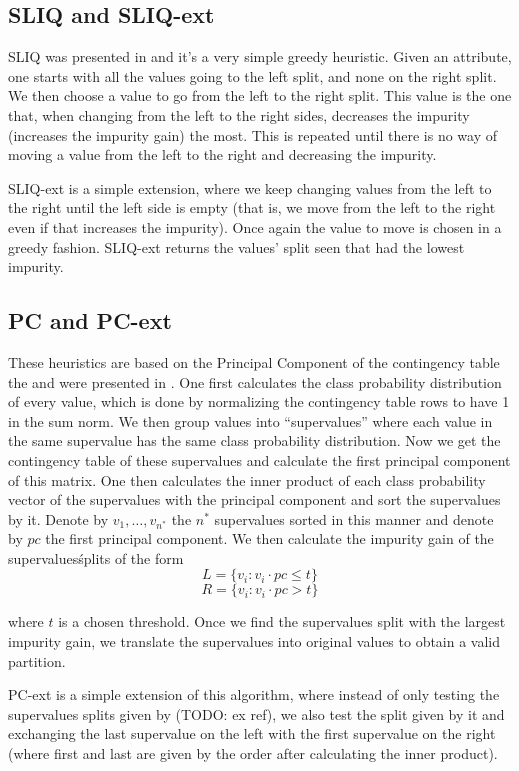 \subsection{SLIQ and SLIQ-ext}
SLIQ was presented in \cite{mehta1996sliq} and it's a very simple greedy heuristic. Given an attribute, one starts with all the values going to the left split, and none on the right split. We then choose a value to go from the left to the right split. This value is the one that, when changing from the left to the right sides, decreases the impurity (increases the impurity gain) the most. This is repeated until there is no way of moving a value from the left to the right and decreasing the impurity.

SLIQ-ext is a simple extension, where we keep changing values from the left to the right until the left side is empty (that is, we move from the left to the right even if that increases the impurity). Once again the value to move is chosen in a greedy fashion. SLIQ-ext returns the values' split seen that had the lowest impurity.

\subsection{PC and PC-ext}
These heuristics are based on the Principal Component of the contingency table the and were presented in \cite{journals/datamine/CoppersmithHH99}. One first calculates the class probability distribution of every value, which is done by normalizing the contingency table rows to have 1 in the sum norm. We then group values into ``supervalues'' where each value in the same supervalue has the same class probability distribution. Now we get the contingency table of these supervalues and calculate the first principal component of this matrix. One then calculates the inner product of each class probability vector of the supervalues  with the principal component and sort the supervalues by it. Denote by $v_1,\ldots,v_{n^*}$ the $n^*$ supervalues sorted in this manner and denote by $pc$ the first principal component. We then calculate the impurity gain of the supervalues\' splits of the form
$$L = \{v_i : v_i \cdot pc \leq t\}$$
$$R = \{v_i : v_i \cdot pc > t\}$$

where $t$ is a chosen threshold. Once we find the supervalues split with the largest impurity gain, we translate the supervalues into original values to obtain a valid partition.

PC-ext is a simple extension of this algorithm, where instead of only testing the supervalues splits given by (TODO: ex ref), we also test the split given by it and exchanging the last supervalue on the left with the first supervalue on the right (where first and last are given by the order after calculating the inner product).

